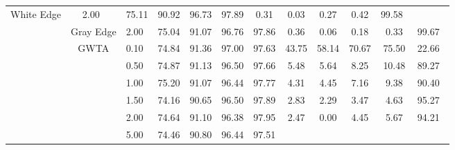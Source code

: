 \begin{table}[htbp]
{\begin{tabular}{cc|c|ccccccccc}
  White Edge &
  2.00\ &
  \multicolumn{1}{c|}{75.11} &
  \multicolumn{1}{c|}{90.92} &
  \multicolumn{1}{c|}{96.73} &
  \multicolumn{1}{c|}{97.89} &
  \multicolumn{1}{c|}{0.31} &
  \multicolumn{1}{c|}{0.03} &
  \multicolumn{1}{c|}{0.27} &
  \multicolumn{1}{c|}{0.42} &
  99.58\ \\ \cline{2-12} 
\multicolumn{1}{c|}{} &
  Gray Edge &
  2.00\ &
  \multicolumn{1}{c|}{75.04} &
  \multicolumn{1}{c|}{91.07} &
  \multicolumn{1}{c|}{96.76} &
  \multicolumn{1}{c|}{97.86} &
  \multicolumn{1}{c|}{0.36} &
  \multicolumn{1}{c|}{0.06} &
  \multicolumn{1}{c|}{0.18} &
  \multicolumn{1}{c|}{0.33} &
  99.67\ \\ \cline{2-12} 
\multicolumn{1}{c|}{} &
  \multirow{9}{*}{GWTA}&
  0.10\ &
  \multicolumn{1}{c|}{74.84} &
  \multicolumn{1}{c|}{91.36} &
  \multicolumn{1}{c|}{97.00} &
  \multicolumn{1}{c|}{97.63} &
  \multicolumn{1}{c|}{43.75} &
  \multicolumn{1}{c|}{58.14} &
  \multicolumn{1}{c|}{70.67} &
  \multicolumn{1}{c|}{75.50} &
  22.66\ \\ \cline{3-12} 
\multicolumn{1}{c|}{} &
   &
  0.50\ &
  \multicolumn{1}{c|}{74.87} &
  \multicolumn{1}{c|}{91.13} &
  \multicolumn{1}{c|}{96.50} &
  \multicolumn{1}{c|}{97.66} &
  \multicolumn{1}{c|}{5.48} &
  \multicolumn{1}{c|}{5.64} &
  \multicolumn{1}{c|}{8.25} &
  \multicolumn{1}{c|}{10.48} &
  89.27\ \\ \cline{3-12} 
\multicolumn{1}{c|}{} &
   &
  1.00\ &
  \multicolumn{1}{c|}{75.20} &
  \multicolumn{1}{c|}{91.07} &
  \multicolumn{1}{c|}{96.44} &
  \multicolumn{1}{c|}{97.77} &
  \multicolumn{1}{c|}{4.31} &
  \multicolumn{1}{c|}{4.45} &
  \multicolumn{1}{c|}{7.16} &
  \multicolumn{1}{c|}{9.38} &
  90.40\ \\ \cline{3-12} 
\multicolumn{1}{c|}{} &
   &
  1.50\ &
  \multicolumn{1}{c|}{74.16} &
  \multicolumn{1}{c|}{90.65} &
  \multicolumn{1}{c|}{96.50} &
  \multicolumn{1}{c|}{97.89} &
  \multicolumn{1}{c|}{2.83} &
  \multicolumn{1}{c|}{2.29} &
  \multicolumn{1}{c|}{3.47} &
  \multicolumn{1}{c|}{4.63} &
  95.27\ \\ \cline{3-12} 
\multicolumn{1}{c|}{} &
   &
  2.00\ &
  \multicolumn{1}{c|}{74.64} &
  \multicolumn{1}{c|}{91.10} &
  \multicolumn{1}{c|}{96.38} &
  \multicolumn{1}{c|}{97.95} &
  \multicolumn{1}{c|}{2.47} &
  \multicolumn{1}{c|}{0.00} &
  \multicolumn{1}{c|}{4.45} &
  \multicolumn{1}{c|}{5.67} &
  94.21\ \\ \cline{3-12} 
\multicolumn{1}{c|}{} &
   &
  5.00\ &
  \multicolumn{1}{c|}{74.46} &
  \multicolumn{1}{c|}{90.80} &
  \multicolumn{1}{c|}{96.44} &
  \multicolumn{1}{c|}{97.51} &

\end{tabular}}
\end{table}
